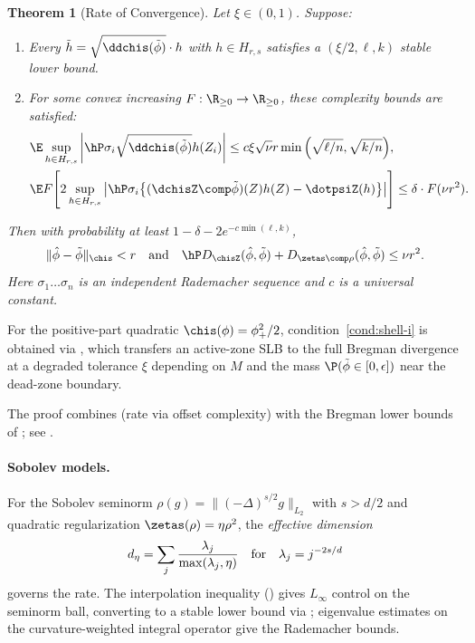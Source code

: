 \documentclass{article}
\newtheorem{theorem}{Theorem}[section]
\begin{document}
\begin{theorem}[Rate of Convergence]
\label{thm:rate-main}
Let $\xi \in (0,1)$. Suppose:
\begin{enumerate}
\item[(i)] Every $\tilde h = \sqrt{\ddchis(\tilde\phi)} \cdot h$ with $h \in H_{r,s}$ satisfies a $(\xi/2, \ell, k)$ stable lower bound.
\item[(ii)] For some convex increasing $F: \R_{\ge 0} \to \R_{\ge 0}$, these complexity bounds are satisfied:
\begin{align}
&\E \sup_{h \in H_{r,s}} \qty| \hP \sigma_i \sqrt{\ddchis(\tilde\phi)} h(Z_i) | \le c \xi \sqrt{\nu} r \min\qty(\sqrt{\ell/n}, \sqrt{k/n}), \label{eq:rademacher-complexity} \\
&\E F\qty[ 2 \sup_{h \in H_{r,s}} \qty| \hP \sigma_i \qty{(\dchisZ \comp \tilde\phi)(Z)h(Z) - \dotpsiZ(h)} | ] \le \delta \cdot F(\nu r^2). \label{eq:F-complexity}
\end{align}
\end{enumerate}
Then with probability at least $1 - \delta - 2e^{-c\min(\ell,k)}$,
\[
\|\hat\phi - \tilde\phi\|_{\chis} < r \qqtext{and} \hP D_{\chisZ}(\hat\phi, \tilde\phi) + D_{\zetas \comp \rho}(\hat\phi, \tilde\phi) \le \nu r^2.
\]
Here $\sigma_1 \ldots \sigma_n$ is an independent Rademacher sequence and $c$ is a universal constant.
\end{theorem}
For the positive-part quadratic $\chis(\phi) = \phi_+^2/2$, condition~\ref{cond:shell-i} is obtained via , which transfers an active-zone SLB to the full Bregman divergence at a degraded tolerance $\xi$ depending on $M$ and the mass $\P(\tilde\phi \in [0,\epsilon])$ near the dead-zone boundary.

The proof combines  (rate via offset complexity) with the Bregman lower bounds of ; see .

\paragraph{Sobolev models.}
For the Sobolev seminorm $\rho(g) = \|(-\Delta)^{s/2} g\|_{L_2}$ with $s > d/2$ and quadratic regularization $\zetas(\rho) = \eta \rho^2$, the \emph{effective dimension}
\[
d_\eta = \sum_j \frac{\lambda_j}{\max(\lambda_j, \eta)} \qqtext{for} \lambda_j = j^{-2s/d}
\]
governs the rate. The interpolation inequality () gives $L_\infty$ control on the seminorm ball, converting to a stable lower bound via ; eigenvalue estimates on the curvature-weighted integral operator give the Rademacher bounds.
\end{document}
